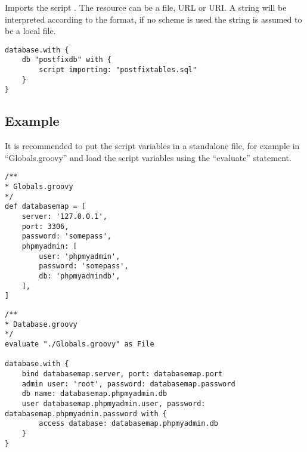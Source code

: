
Imports the script . The resource can be a file, URL or URI. 
A string will be interpreted according to the format, if no scheme is used 
the string is assumed to be a local file.

\begin{lstlisting}[style=Groovy]
database.with {
    db "postfixdb" with {
        script importing: "postfixtables.sql"
    }
}
\end{lstlisting}

\subsection[Database Example]{Example}

It is recommended to put the script variables in a standalone file, for example
in ``Globals.groovy'' and load the script variables using 
the ``evaluate'' statement.

\vspace{1em}
\begin{lstlisting}[style=Groovy,caption={Predefined database variables.}]
/**
* Globals.groovy
*/
def databasemap = [
    server: '127.0.0.1',
    port: 3306,
    password: 'somepass',
    phpmyadmin: [
        user: 'phpmyadmin',
        password: 'somepass',
        db: 'phpmyadmindb',
    ],
]
\end{lstlisting}

\begin{lstlisting}[style=Groovy,caption={Database script example.}]
/**
* Database.groovy
*/
evaluate "./Globals.groovy" as File

database.with {
    bind databasemap.server, port: databasemap.port
    admin user: 'root', password: databasemap.password
    db name: databasemap.phpmyadmin.db
    user databasemap.phpmyadmin.user, password: databasemap.phpmyadmin.password with {
        access database: databasemap.phpmyadmin.db
    }
}
\end{lstlisting}
